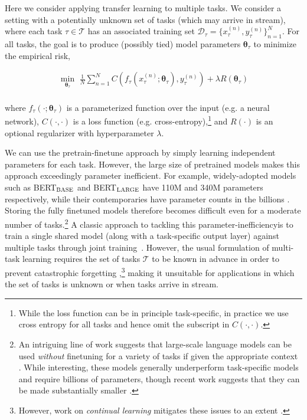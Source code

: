 Here we consider applying transfer learning to multiple tasks. We consider a setting with a potentially unknown set of tasks (which may arrive in stream), where each task $\tau \in \mathcal{T}$ has an associated training set $\mathcal{D}_\tau = \{x^{(n)}_\tau, y^{(n)}_\tau \}_{n=1}^N$. For all tasks, the goal is to produce (possibly tied) model parameters $\boldsymbol{\theta}_\tau$ to minimize the empirical risk,

\begin{align*}
    \min_{\boldsymbol{\theta}_{\tau}} \,\, \frac{1}{N} \sum_{n=1}^N C\left(f_\tau(x_\tau^{(n)}; \boldsymbol{\theta}_\tau), y_\tau^{(n)}\right) + \lambda R( \boldsymbol{\theta}_\tau ) \\[-6mm]
\end{align*}

 
where $f_\tau(\cdot ; \boldsymbol{\theta}_\tau)$ is a parameterized function over the input (e.g. a neural network), $C(\cdot, \cdot)$ is a loss function (e.g. cross-entropy),\footnote{While the loss function can be in principle task-specific, in practice we use cross entropy for all tasks and hence omit the subscript in  $C(\cdot, \cdot)$.} and $R(\cdot)$ is an optional regularizer with hyperparameter $\lambda$. 

We can use the pretrain-finetune approach by simply learning independent parameters for each task. However, the large size of pretrained models makes this approach exceedingly parameter inefficient. For example, widely-adopted models such as BERT$_{\textsc{BASE}}$ and BERT$_{\textsc{LARGE}}$ have 110M and 340M parameters respectively, while their contemporaries have parameter counts in the billions \citep{raffel20205t5,shoeybi2019mega,raj2019turing}. Storing the fully finetuned models therefore becomes difficult even for a moderate number of tasks.\footnote{An intriguing line of work suggests that  large-scale language models can be used \emph{without} finetuning for a variety of tasks if given the appropriate context \citep{radford2019language,brown2020language}. While interesting, these models generally underperform task-specific models and require billions of parameters, though recent work suggests that they can be made substantially smaller \citep{schick2020size}.} A classic approach to tackling this parameter-inefficiencyis to train a single shared model (along with a task-specific output layer) against multiple tasks through joint training~\citep{caruana1997mtl}. However, the usual formulation of multi-task learning requires the set of tasks $\mathcal{T}$ to be known in advance in order to prevent catastrophic forgetting \citep{french1999forgetting},\footnote{However, work on \emph{continual learning}  mitigates these issues to an extent \citep{NIPS2017_6892,GradientEpisodicMemory,NIPS2017_7051,kirkpatrick2017pnas}.} making it unsuitable for applications in which the set of tasks is unknown or when tasks arrive in stream. 

